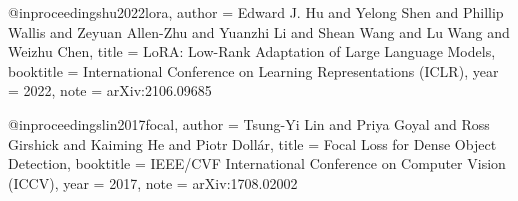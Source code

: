 
@inproceedings{hu2022lora,
  author    = {Edward J. Hu and Yelong Shen and Phillip Wallis and Zeyuan Allen-Zhu and Yuanzhi Li and Shean Wang and Lu Wang and Weizhu Chen},
  title     = {{LoRA}: Low-Rank Adaptation of Large Language Models},
  booktitle = {International Conference on Learning Representations (ICLR)},
  year      = {2022},
  note      = {arXiv:2106.09685}
}


@inproceedings{lin2017focal,
  author    = {Tsung-Yi Lin and Priya Goyal and Ross Girshick and Kaiming He and Piotr Doll\'{a}r},
  title     = {Focal Loss for Dense Object Detection},
  booktitle = {IEEE/CVF International Conference on Computer Vision (ICCV)},
  year      = {2017},
  note      = {arXiv:1708.02002}
}
